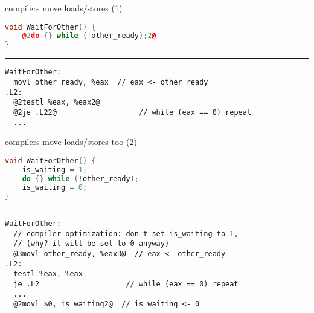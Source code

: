 \begin{frame}[fragile,label=compReorder]{compilers move loads/stores (1)}
\begin{lstlisting}[language=C++,style=small,
    moredelim={**[is][\btHL<2|handout:2>]{@2}{2@}},
    moredelim={**[is][\btHL<3|handout:3>]{@3}{3@}},
    moredelim={**[is][\btHL<4|handout:4>]{@4}{4@}},
    moredelim={**[is][\btHL<5|handout:5>]{@5}{5@}},
]
void WaitForOther() {
    @2do {} while (!other_ready);2@
}
\end{lstlisting}
\hrule
\begin{lstlisting}[language=myasm,style=smaller,
    moredelim={**[is][\btHL<2|handout:2>]{@2}{2@}},
    moredelim={**[is][\btHL<3|handout:3>]{@3}{3@}},
    moredelim={**[is][\btHL<4|handout:4>]{@4}{4@}},
    moredelim={**[is][\btHL<5|handout:5>]{@5}{5@}},
]
WaitForOther:
  movl other_ready, %eax  // eax <- other_ready
.L2:
  @2testl %eax, %eax2@
  @2je .L22@                   // while (eax == 0) repeat
  ...
\end{lstlisting}
\end{frame}

\begin{frame}[fragile,label=compReorder2]{compilers move loads/stores too (2)}
\begin{lstlisting}[language=C++,style=small,
    moredelim={**[is][\btHL<2|handout:2>]{@2}{2@}},
    moredelim={**[is][\btHL<3|handout:3>]{@3}{3@}},
    moredelim={**[is][\btHL<4|handout:4>]{@4}{4@}},
    moredelim={**[is][\btHL<5|handout:5>]{@5}{5@}},
]
void WaitForOther() {
    is_waiting = 1;
    do {} while (!other_ready);
    is_waiting = 0;
}
\end{lstlisting}
\hrule
\begin{lstlisting}[language=myasm,style=small,
    moredelim={**[is][\btHL<2|handout:2>]{@2}{2@}},
    moredelim={**[is][\btHL<3|handout:3>]{@3}{3@}},
    moredelim={**[is][\btHL<4|handout:4>]{@4}{4@}},
    moredelim={**[is][\btHL<5|handout:5>]{@5}{5@}},
]
WaitForOther:  
  // compiler optimization: don't set is_waiting to 1,
  // (why? it will be set to 0 anyway)
  @3movl other_ready, %eax3@  // eax <- other_ready
.L2:
  testl %eax, %eax          
  je .L2                    // while (eax == 0) repeat
  ...
  @2movl $0, is_waiting2@  // is_waiting <- 0
\end{lstlisting}
\end{frame}
